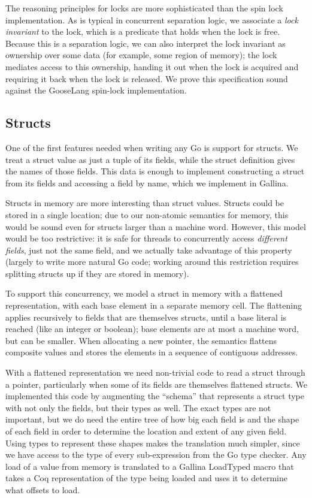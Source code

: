 The reasoning principles for locks are more sophisticated than the spin
lock implementation. As is typical in concurrent separation logic, we
associate a \emph{lock invariant} to the lock, which is a predicate that
holds when the lock is free. Because this is a separation logic, we can
also interpret the lock invariant as ownership over some data (for
example, some region of memory); the lock mediates access to this
ownership, handing it out when the lock is acquired and requiring it
back when the lock is released. We prove this specification sound
against the GooseLang spin-lock implementation.

\hypertarget{structs}{%
\subsection{Structs}\label{structs}}

One of the first features needed when writing any Go is support for
structs. We treat a struct value as just a tuple of its fields, while
the struct definition gives the names of those fields. This data is
enough to implement constructing a struct from its fields and accessing
a field by name, which we implement in Gallina.

Structs in memory are more interesting than struct values. Structs could
be stored in a single location; due to our non-atomic semantics for
memory, this would be sound even for structs larger than a machine word.
However, this model would be too restrictive: it is safe for threads to
concurrently access \emph{different fields}, just not the same field,
and we actually take advantage of this property (largely to write more
natural Go code; working around this restriction requires splitting
structs up if they are stored in memory).

To support this concurrency, we model a struct in memory with a
flattened representation, with each base element in a separate memory
cell. The flattening applies recursively to fields that are themselves
structs, until a base literal is reached (like an integer or boolean);
base elements are at most a machine word, but can be smaller. When
allocating a new pointer, the semantics flattens composite values and
stores the elements in a sequence of contiguous addresses.

With a flattened representation we need non-trivial code to read a
struct through a pointer, particularly when some of its fields are
themselves flattened structs. We implemented this code by augmenting the
``schema'' that represents a struct type with not only the fields, but
their types as well. The exact types are not important, but we do need
the entire tree of how big each field is and the shape of each field in
order to determine the location and extent of any given field. Using
types to represent these shapes makes the translation much simpler,
since we have access to the type of every sub-expression from the Go
type checker. Any load of a value from memory is translated to a Gallina
LoadTyped macro that takes a Coq representation of the type being loaded
and uses it to determine what offsets to load.

